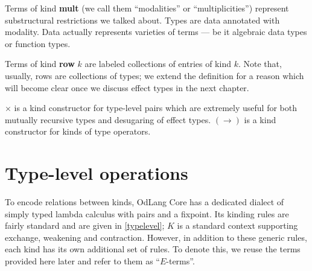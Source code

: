 \documentclass[a4paper,14pt]{extreport}
\begin{document}
Terms of kind \textbf{mult} (we call them ``modalities'' or ``multiplicities'')
represent substructural restrictions we talked about. Types are data
annotated with modality. Data actually represents varieties of terms --- be
it algebraic data types or function types.

Terms of kind \textbf{row} $k$ are labeled collections of entries of kind $k$.
Note that, usually, rows are collections of types; we extend the definition for
a reason which will become clear once we discuss effect types in the next
chapter.

$\times$ is a kind constructor for type-level pairs which are extremely useful
for both mutually recursive types and desugaring of effect types. $(\to)$ is a
kind constructor for kinds of type operators.

\section{Type-level operations}

To encode relations between kinds, OdLang Core has a dedicated dialect of simply
typed lambda calculus with pairs and a fixpoint. Its kinding rules are fairly
standard and are given in \ref{typelevel}; $K$ is a standard context supporting
exchange, weakening and contraction. However, in addition to these generic
rules, each kind has its own additional set of rules. To denote this, we reuse
the terms provided here later and refer to them as ``$E$-terms''.
\end{document}
